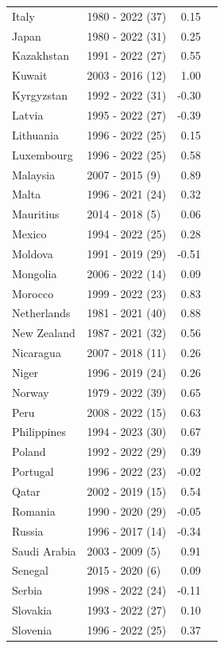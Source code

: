 \begin{table}[pos=h]
{{\centering
\begin{tabular}{llrr} Italy & 1980 - 2022 (37) & 0.15\\
Japan & 1980 - 2022 (31) & 0.25\\
Kazakhstan & 1991 - 2022 (27) & 0.55\\
Kuwait & 2003 - 2016 (12) & 1.00\\
Kyrgyzstan & 1992 - 2022 (31) & -0.30\\
\addlinespace
Latvia & 1995 - 2022 (27) & -0.39\\
Lithuania & 1996 - 2022 (25) & 0.15\\
Luxembourg & 1996 - 2022 (25) & 0.58\\
Malaysia & 2007 - 2015 (9) & 0.89\\
Malta & 1996 - 2021 (24) & 0.32\\
\addlinespace
Mauritius & 2014 - 2018 (5) & 0.06\\
Mexico & 1994 - 2022 (25) & 0.28\\
Moldova & 1991 - 2019 (29) & -0.51\\
Mongolia & 2006 - 2022 (14) & 0.09\\
Morocco & 1999 - 2022 (23) & 0.83\\
\addlinespace
Netherlands & 1981 - 2021 (40) & 0.88\\
New Zealand & 1987 - 2021 (32) & 0.56\\
Nicaragua & 2007 - 2018 (11) & 0.26\\
Niger & 1996 - 2019 (24) & 0.26\\
Norway & 1979 - 2022 (39) & 0.65\\
\addlinespace
Peru & 2008 - 2022 (15) & 0.63\\
Philippines & 1994 - 2023 (30) & 0.67\\
Poland & 1992 - 2022 (29) & 0.39\\
Portugal & 1996 - 2022 (23) & -0.02\\
Qatar & 2002 - 2019 (15) & 0.54\\
\addlinespace
Romania & 1990 - 2020 (29) & -0.05\\
Russia & 1996 - 2017 (14) & -0.34\\
Saudi Arabia & 2003 - 2009 (5) & 0.91\\
Senegal & 2015 - 2020 (6) & 0.09\\
Serbia & 1998 - 2022 (24) & -0.11\\
\addlinespace
Slovakia & 1993 - 2022 (27) & 0.10\\
Slovenia & 1996 - 2022 (25) & 0.37\\

\end{tabular}}}
\end{table}
